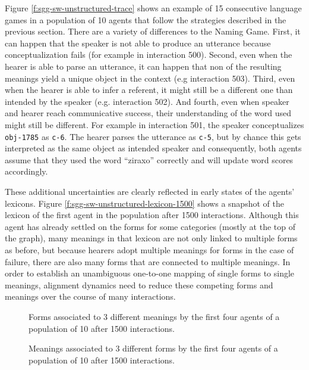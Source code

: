 Figure \ref{f:sgg-sw-unstructured-trace} shows an example of 15
consecutive language games in a population of 10 agents that follow
the strategies described in the previous section. There are a variety
of differences to the Naming Game. First, it can happen that the
speaker is not able to produce an utterance because conceptualization
fails (for example in interaction 500). Second, even when the hearer
is able to parse an utterance, it can happen that non of the resulting
meanings yield a unique object in the context (e.g interaction
503). Third, even when the hearer is able to infer a referent, it
might still be a different one than intended by the speaker
(e.g. interaction 502). And fourth, even when speaker and hearer reach
communicative success, their understanding of the word used might
still be different. For example in interaction 501, the speaker
conceptualizes \texttt{obj-1785} as \texttt{c-6}. The hearer parses
the utterance as \texttt{c-5}, but by chance this gets interpreted as
the same object as intended speaker and consequently, both agents
assume that they used the word ``ziraxo'' correctly and will update
word scores accordingly.



These additional uncertainties are clearly reflected in early states
of the agents' lexicons. Figure
\ref{f:sgg-sw-unstructured-lexicon-1500} shows a snapshot of the
lexicon of the first agent in the population after 1500
interactions. Although this agent has already settled on the forms for
some categories (mostly at the top of the graph), many meanings in
that lexicon are not only linked to multiple forms as before, but
because hearers adopt multiple meanings for forms in the case of
failure, there are also many forms that are connected to multiple
meanings. In order to establish an unambiguous one-to-one mapping of
single forms to single meanings, alignment dynamics need to reduce
these competing forms and meanings over the course of many
interactions.

\startfiguregroup


\begin{figure}[t]
  
  \caption{Forms associated to 3 different meanings by the first four
    agents of a population of 10 after 1500 interactions.}
  \label{f:sgg-sw-unstructured-lexicon-meanings-1500}
\end{figure}

\begin{figure}[t]
  
  \caption{Meanings associated to 3 different forms by the first four
    agents of a population of 10 after 1500 interactions.}
  \label{f:sgg-sw-unstructured-lexicon-forms-1500}
\end{figure}

